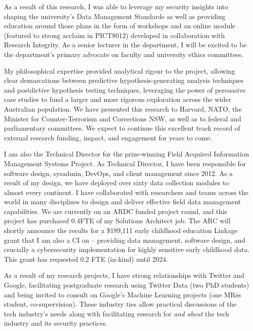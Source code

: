 \documentclass[11pt, a4paper]{awesome-cv}
\begin{document}
\begin{cvletter}
As a result of this research, I was able to leverage my security insights into shaping the university's Data Management Standards as well as providing education around those plans in the form of workshops and an online module (featured to strong acclaim in PICT8012) developed in collaboration with Research Integrity. As a senior lecturer in the department, I will be excited to be the department's primary advocate on faculty and university ethics committees. 

My philosophical expertise provided analytical rigour to the project, allowing clear demarcations between predictive hypothesis-generating analysis techniques and postdictive hypothesis testing techniques, leveraging the power of persuasive case studies to fund a larger and more rigorous exploration across the wider Australian population. We have presented this research to Harvard, NATO, the Minister for Counter-Terrorism and Corrections NSW, as well as to federal and parliamentary committees. We expect to continue this excellent track record of external research funding, impact, and engagement for years to come.

I am also the Technical Director for the prize-winning Field Acquired Information Management Systems Project. As Technical Director, I have been responsible for software design, sysadmin, DevOps, and client management since 2012. As a result of my design, we have deployed over sixty data collection modules to almost every continent. I have collaborated with researchers and teams across the world in many disciplines to design and deliver effective field data management capabilities. We are currently on an ARDC funded project round, and this project has purchased 0.4FTE of my Solutions Architect job. The ARC will shortly announce the results for a \$189,111 early childhood education Linkage grant that I am also a CI on -- providing data management, software design, and crucially a cybersecurity implementation for highly sensitive early childhood data. This grant has requested 0.2 FTE (in-kind) until 2024. 

As a result of my research projects, I have strong relationships with Twitter and Google, facilitating postgraduate research using Twitter Data (two PhD students) and being invited to consult on Google's Machine Learning projects (one MRes student, co-supervision). These industry ties allow practical discussions of the tech industry's needs along with facilitating research for \textit{and about} the tech industry and its security practices. 


\end{cvletter}
\end{document}
